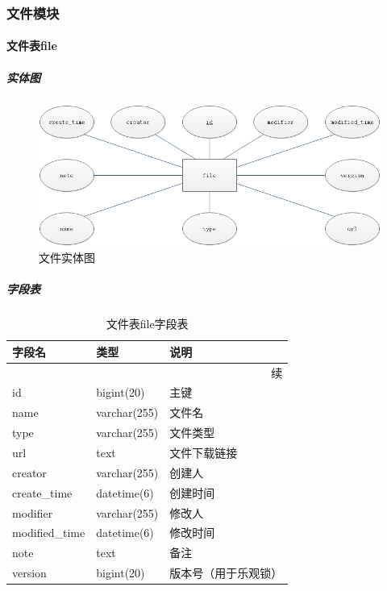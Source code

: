 \documentclass[titlepage,UTF8,linespread=1.5]{ctexart}
\begin{document}
\subsubsection{文件模块}
\paragraph{文件表file}
\subparagraph{实体图}
\begin{figure}[H]
    \centering
    \includegraphics[width=140mm]{entity-file.png}
    \caption{文件实体图}
    \label{fig:entity-file}
\end{figure}
\subparagraph{字段表}
\begin{longtable}{|p{10em}|p{6em}|p{15em}|}
    \caption{文件表file字段表}\label{tab:table_file}     \\\hline
    字段名         & 类型         & 说明                 \\\hline
    \endfirsthead
    \multicolumn{3}{r}{{续\tablename\thetable{}}}        \\\hline
    \endhead
    id             & bigint(20)   & 主键                 \\\hline
    name           & varchar(255) & 文件名               \\\hline
    type           & varchar(255) & 文件类型             \\\hline
    url            & text         & 文件下载链接         \\\hline
    creator        & varchar(255) & 创建人               \\\hline
    create\_time   & datetime(6)  & 创建时间             \\\hline
    modifier       & varchar(255) & 修改人               \\\hline
    modified\_time & datetime(6)  & 修改时间             \\\hline
    note           & text         & 备注                 \\\hline
    version        & bigint(20)   & 版本号（用于乐观锁） \\\hline
\end{longtable}\par
\clearpage
\end{document}
